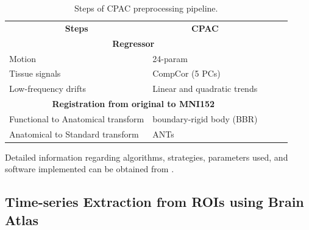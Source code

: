 \begin{table}[h!]
\begin{center}
    \caption{Steps of CPAC preprocessing pipeline.}
    \label{tab:3.1}
\begin{tabular}{|l|l|lll}
\cline{1-2}
\multicolumn{1}{|c|}{\textbf{Steps}} & \multicolumn{1}{c|}{\textbf{CPAC}} &  &  &  \\ \cline{1-2}
\multicolumn{2}{|c|}{\textbf{Regressor}}                                  &  &  &  \\ \cline{1-2}
Motion                               & 24-param                           &  &  &  \\ \cline{1-2}
Tissue signals                       & CompCor (5 PCs)                    &  &  &  \\ \cline{1-2}
Low-frequency drifts                 & Linear and quadratic trends        &  &  &  \\ \cline{1-2}
\multicolumn{2}{|c|}{\textbf{Registration from original to MNI152}}       &  &  &  \\ \cline{1-2}
Functional to Anatomical transform   & boundary-rigid body (BBR)          &  &  &  \\ \cline{1-2}
Anatomical to Standard transform     & ANTs                               &  &  &  \\ \cline{1-2}
\end{tabular}
\end{center}
\end{table}

Detailed information regarding algorithms, strategies, parameters used, and software implemented can be obtained from \cite{abidepreprocessed}.

\subsection{Time-series Extraction from ROIs using Brain Atlas}

